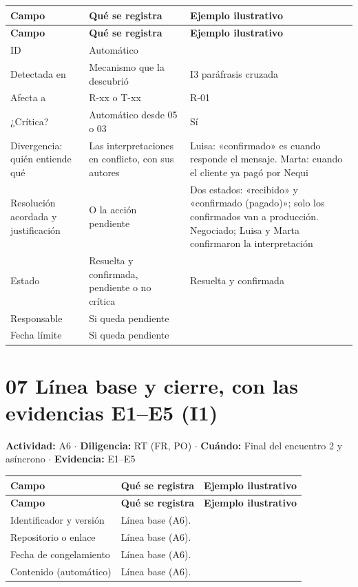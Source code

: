 \documentclass[12pt,letterpaper,oneside]{report}
\begin{document}
{\scriptsize\renewcommand{\arraystretch}{1.25}\setlength{\tabcolsep}{3pt}
\begin{xltabular}{\textwidth}{@{}>{\raggedright\arraybackslash}p{0.25\textwidth}>{\raggedright\arraybackslash}X>{\raggedright\arraybackslash}p{0.30\textwidth}@{}}
\toprule
\textbf{Campo} & \textbf{Qué se registra} & \textbf{Ejemplo ilustrativo} \\
\midrule
\endfirsthead
\toprule
\textbf{Campo} & \textbf{Qué se registra} & \textbf{Ejemplo ilustrativo} \\
\midrule
\endhead
\bottomrule
\endlastfoot
{}ID & Automático &  \\
Detectada en & Mecanismo que la descubrió & I3 paráfrasis cruzada \\
Afecta a & R-xx o T-xx & R-01 \\
¿Crítica? & Automático desde 05 o 03 & Sí \\
Divergencia: quién entiende qué & Las interpretaciones en conflicto, con sus autores & Luisa: «confirmado» es cuando responde el mensaje. Marta: cuando el cliente ya pagó por Nequi \\
Resolución acordada y justificación & O la acción pendiente & Dos estados: «recibido» y «confirmado (pagado)»; solo los confirmados van a producción. Negociado; Luisa y Marta confirmaron la interpretación \\
Estado & Resuelta y confirmada, pendiente o no crítica & Resuelta y confirmada \\
Responsable & Si queda pendiente &  \\
Fecha límite & Si queda pendiente &  \\
\end{xltabular}}

\section{07 Línea base y cierre, con las evidencias E1--E5 (I1)}
\noindent\textbf{Actividad:} A6 $\cdot$ \textbf{Diligencia:} RT (FR, PO) $\cdot$ \textbf{Cuándo:} Final del encuentro 2 y asíncrono $\cdot$ \textbf{Evidencia:} E1–E5


{\scriptsize\renewcommand{\arraystretch}{1.25}\setlength{\tabcolsep}{3pt}
\begin{xltabular}{\textwidth}{@{}>{\raggedright\arraybackslash}p{0.25\textwidth}>{\raggedright\arraybackslash}X>{\raggedright\arraybackslash}p{0.30\textwidth}@{}}
\toprule
\textbf{Campo} & \textbf{Qué se registra} & \textbf{Ejemplo ilustrativo} \\
\midrule
\endfirsthead
\toprule
\textbf{Campo} & \textbf{Qué se registra} & \textbf{Ejemplo ilustrativo} \\
\midrule
\endhead
\bottomrule
\endlastfoot
Identificador y versión & Línea base (A6). &  \\
Repositorio o enlace & Línea base (A6). &  \\
Fecha de congelamiento & Línea base (A6). &  \\
Contenido (automático) & Línea base (A6). &  \\
\end{xltabular}}
\end{document}
